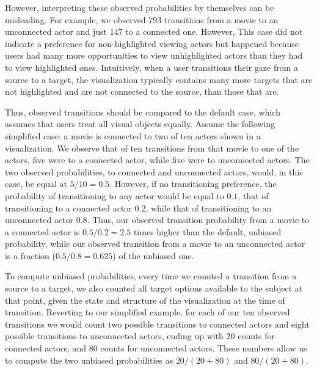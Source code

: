 However, interpreting these observed probabilities by themselves can be misleading. For example, we observed 793 transitions from a movie to an unconnected actor and just 147 to a connected one. However, This case did not indicate a preference for non-highlighted viewing actors but happened because users had many more opportunities to view unhighlighted actors than they had to view highlighted ones. Intuitively, when a user transitions their gaze from a source to a target, the visualization typically contains many more targets that are not highlighted and are not connected to the source, than those that are. 

Thus, observed transitions should be compared to the default case, which assumes that users treat all visual objects equally. Assume the following simplified case: a movie is connected to two of ten actors shown in a visualization. We observe that of ten transitions from that movie to one of the actors, five were to a connected actor, while five were to unconnected actors. The two observed probabilities, to connected and unconnected actors, would, in this case, be equal at $5/10 = 0.5$. However, if no transitioning preference, the probability of transitioning to any actor would be equal to $0.1$, that of transitioning to a connected actor $0.2$, while that of transitioning to an unconnected actor $0.8$. Thus, our observed transition probability from a movie to a connected actor is $0.5/0.2=2.5$ times higher than the default, unbiased probability, while our observed transition from a movie to an unconnected actor is a fraction ($0.5/0.8=0.625$) of the unbiased one.  

To compute unbiased probabilities, every time we counted a transition from a source to a target, we also counted all target options available to the subject at that point, given the state and structure of the visualization at the time of transition. Reverting to our simplified example, for each of our ten observed transitions we would count two possible transitions to connected actors and eight possible transitions to unconnected actors, ending up with $20$ counts for connected actors, and $80$ counts for unconnected actors. These numbers allow us to compute the two unbiased probabilities as $20/(20+80)$ and $80/(20+80)$.

